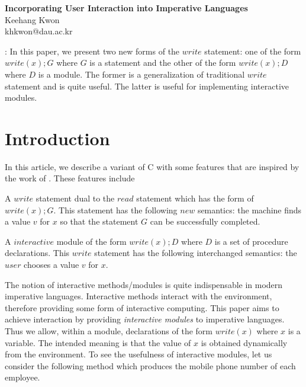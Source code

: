 \documentclass[12pt]{article}
\title{}
\newenvironment{numberedlist}
{\begin{list}{\makebox[20pt]{\hss(\arabic{itemno})\enspace}}
             {\usecounter{itemno}\labelwidth 20pt}}{\end{list}}
\newcounter{itemno}
\newcounter{itemno1}
\newcounter{itemno2}
\begin{document}
	
\begin{center}
{\Large {\bf 
Incorporating  User Interaction  into Imperative  Languages}}
\\[20pt] 
Keehang Kwon \\
khkwon@dau.ac.kr
\end{center}
	
: 
In this paper, we  present two new forms of the $write$ statement: one  of the form $write(x);G$
where $G$ is a statement and the other of the form $write(x);D$ where $D$ is a module.
The former is a generalization of traditional $write$ statement and is
quite useful.  The latter is useful for implementing interactive modules.








\section{Introduction}\label{sec:intro}

In this article, we describe a variant of C with some features that are 
inspired by the work of \cite{Jap03}.
These features include

\begin{numberedlist}

\item A $write$ statement dual to the $read$ statement which has the form of
     $write(x); G$. This statement  has the following $new$ semantics: the machine finds
    a value $v$ for $x$ so that the statement $G$  can be successfully completed.

\item A $interactive$ module of the form $write(x); D$ where $D$ is a set of procedure declarations.
This $write$ statement  has the following interchanged semantics:  the $user$ chooses 
    a value $v$ for $x$.

\end{numberedlist}

The notion of interactive methods/modules is quite indispensable in modern imperative languages. 
Interactive  methods interact with the environment, therefore providing some form of 
interactive computing. This paper aims to achieve interaction by providing {\it interactive modules}
 to imperative languages. Thus we allow, within a module, declarations of the form $write(x)$ where $x$ is a variable.
 The intended meaning is that  the value of $x$ is obtained dynamically from the environment.
  To see the usefulness of interactive modules, let us consider the following method which produces the mobile phone number of each employee.
\end{document}
